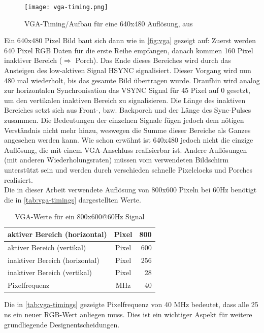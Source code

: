 \documentclass[a4paper,12pt,onesided]{report}
\begin{document}
\begin{figure}[H]
	\centering
	\texttt{[image: vga-timing.png]}
	\caption{VGA-Timing/Aufbau für eine 640x480 Auflösung, aus \cite{vga-timing}}
	\label{fig:vga}
\end{figure}

Ein 640x480 Pixel Bild baut sich dann wie in \autoref{fig:vga} gezeigt auf:
Zuerst werden 640 Pixel RGB Daten für die erste Reihe empfangen, danach kommen 160 Pixel inaktiver Bereich ($\Rightarrow$ Porch). Das Ende dieses Bereiches wird durch das Ansteigen des low-aktiven Signal HSYNC signalisiert. Dieser Vorgang wird nun 480 mal wiederholt, bis das gesamte Bild übertragen wurde. Draufhin wird analog zur horizontalen Synchronisation das VSYNC Signal für 45 Pixel auf 0 gesetzt, um den vertikalen inaktiven Bereich zu signalisieren. Die Länge des inaktiven Bereiches setzt sich aus Front-, bzw. Backporch und der Länge des Sync-Pulses zusammen. 
Die Bedeutungen der einzelnen Signale fügen jedoch dem nötigen Verständnis nicht mehr hinzu, weswegen die Summe dieser Bereiche als Ganzes angesehen werden kann.
Wie schon erwähnt ist 640x480 jedoch nicht die einzige Auflösung, die mit einem VGA-Anschluss realisierbar ist. Andere Auflösungen (mit anderen Wiederholungsraten) müssen vom verwendeten Bildschirm unterstützt sein und werden durch verschieden schnelle Pixelclocks und Porches realisiert.\\
Die in dieser Arbeit verwendete Auflösung von 800x600 Pixeln bei 60Hz benötigt die in \autoref{tab:vga-timings} dargestellten Werte.

\begin{table}[H]
	\centering
	\begin{tabular}{|l|c|r|}	
		\hline
		aktiver Bereich (horizontal) & Pixel & 800 \\ \hline
		aktiver Bereich (vertikal) & Pixel & 600 \\ \hline
		inaktiver Bereich (horizontal) & Pixel & 256 \\ \hline
		inaktiver Bereich (vertikal) & Pixel & 28 \\ \hline
		Pixelfrequenz & MHz & 40 \\ \hline
	\end{tabular}
	\caption{VGA-Werte für ein 800x600@60Hz Signal}
	\label{tab:vga-timings}
\end{table}

Die in \autoref{tab:vga-timings} gezeigte Pixelfrequenz von 40 MHz bedeutet, dass alle 25 ns ein neuer RGB-Wert anliegen muss. Dies ist ein wichtiger Aspekt für weitere grundliegende Designentscheidungen.
\end{document}
